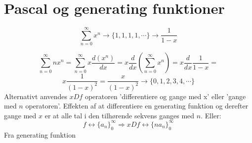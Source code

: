 \section{Pascal og generating funktioner}
\[\sum_{n=0}^{\infty}x^{n} \rightarrow \{1,1,1,1, \dotsm \} \rightarrow \frac{1}{1-x}\]

\[\sum_{n=0}^{\infty}nx^{n}=\sum_{n=0}^{\infty}x\frac{d(x^{n})}{dx}=x\frac{d}{dx}(\sum_{n=0}^{\infty}x^{n})=x \frac{d}{dx}\frac{1}{1-x}=\]
\[x\frac{1}{(1-x)^{2}}=\frac{x}{(1-x)^{2}} \rightarrow \{0,1,2,3,4, \dotsm \}\]
Alternativt anvendes \(xDf\) operatoren 'differentiere og gange med x' eller 'gange med \(n\) operatoren'. Effekten af at differentiere en generating funktion og derefter gange med \(x\) er at alle tal i den tilhørende sekvens ganges med \(n\). Eller:
\[f \leftrightarrow \{a_{n}\}_{0}^{\infty} \Rightarrow xDf \leftrightarrow \{na_{n}\}_{0}^{\infty}\]
Fra generating funktion







